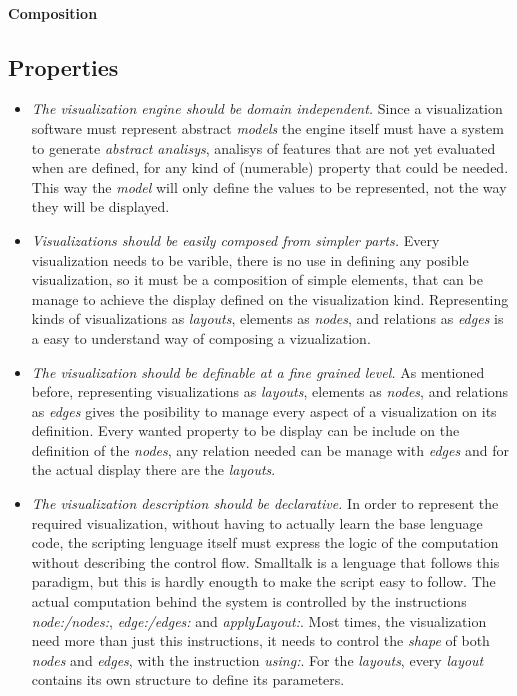 \documentclass{sig-alternate}
\newcommand{\seclabel}[1]{\label{sec:#1}}
\begin{document}
\paragraph{Composition}

\subsection{Properties} \seclabel{properties}

\begin{itemize}
\item \emph{The visualization engine should be domain independent.}
Since a visualization software must represent abstract \emph{models}
the engine itself must have a system to generate \emph{abstract analisys},
analisys of features that are not yet evaluated when are defined, 
for any kind of (numerable) property that could be needed. This way
the \emph{model} will only define the values to be represented, not
the way they will be displayed.

\item \emph{Visualizations should be easily composed from simpler parts.}
Every visualization needs to be varible, there is no use in  defining
any posible visualization, so it must be a composition of simple elements,
that can be manage to achieve the display defined on the visualization kind.
Representing kinds of visualizations as \emph{layouts}, elements as \emph{nodes},
and relations as \emph{edges} is a easy to understand way of composing a
vizualization.
 
\item \emph{The visualization should be definable at a fine grained level.}
As mentioned before, representing visualizations as \emph{layouts}, elements as 
\emph{nodes}, and relations as \emph{edges} gives the posibility to 
manage every aspect of a visualization on its definition. Every wanted
property to be display can be include on the definition of the \emph{nodes},
any relation needed can be manage with \emph{edges} and for the actual display
there are the \emph{layouts}.

\item \emph{The visualization description should be declarative.}
In order to represent the required visualization, without having to 
actually learn the base lenguage code, the scripting lenguage itself
must express the logic of the computation without describing the control 
flow. Smalltalk is a lenguage that follows this paradigm, but this is
hardly enougth to make the script easy to follow. The actual computation
behind the system is controlled by the instructions \emph{node:/nodes:}, 
\emph{edge:/edges:} and \emph{applyLayout:}. Most times, the visualization
need more than just this instructions, it needs to control the \emph{shape}
of both \emph{nodes} and \emph{edges}, with the instruction \emph{using:}. 
For the \emph{layouts}, every \emph{layout} contains its own structure to 
define its parameters.   
\end{itemize}
\end{document}
